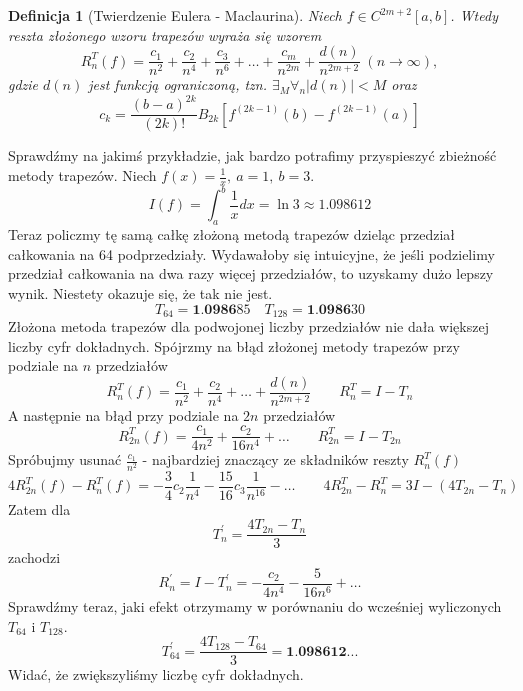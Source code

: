 \documentclass{article}
\newtheorem{defi}{Definicja}
\begin{document}
\begin{defi}[Twierdzenie Eulera - Maclaurina]
	Niech $f \in C^{2m + 2}[a,b]$. Wtedy reszta złożonego wzoru trapezów wyraża się wzorem
	\begin{equation}
		R_n^T(f) = \frac{c_1}{n^2} + \frac{c_2}{n^4} + \frac{c_3}{n^6} + \ldots + \frac{c_m}{n^{2m}} + \frac{d(n)}{n^{2m + 2}} \; (n \to \infty),
	\end{equation}
	gdzie $d(n)$ jest funkcją ograniczoną, tzn. $\exists_{M} \forall_{n} |d(n)| < M$ oraz
	\begin{equation*}
		c_k = \frac{(b - a)^{2k}}{(2k)!} B_{2k} [f^{(2k - 1)}(b) - f^{(2k - 1)}(a)]
	\end{equation*}
\end{defi}

Sprawdźmy na jakimś przykładzie, jak bardzo potrafimy przyspieszyć zbieżność metody trapezów. Niech $f(x) = \frac{1}{x},\ a = 1,\ b = 3$.
\begin{equation*}
	I(f) = \int_a^b \frac{1}{x} dx = \ln 3 \approx 1.098612
\end{equation*}
Teraz policzmy tę samą całkę złożoną metodą trapezów dzieląc przedział całkowania na 64 podprzedziały.
Wydawałoby się intuicyjne, że jeśli podzielimy przedział całkowania na dwa razy więcej przedziałów,
to uzyskamy dużo lepszy wynik. Niestety okazuje się, że tak nie jest.
\begin{equation*}
	T_{64} = \textbf{1.0986}85 \quad T_{128} = \textbf{1.0986}30
\end{equation*}
Złożona metoda trapezów dla podwojonej liczby przedziałów nie dała większej liczby cyfr dokładnych.
Spójrzmy na błąd złożonej metody trapezów przy podziale na $n$ przedziałów
\begin{equation*}
	R_n^T(f) = \frac{c_1}{n^2} + \frac{c_2}{n^4} + \ldots + \frac{d(n)}{n^{2m + 2}} \quad\quad R_n^T = I - T_n
\end{equation*}
A następnie na błąd przy podziale na $2n$ przedziałów
\begin{equation*}
	R_{2n}^T(f) = \frac{c_1}{4n^2} + \frac{c_2}{16n^4} + \ldots  \quad\quad R_{2n}^T = I - T_{2n}
\end{equation*}
Spróbujmy usunać $\frac{c_1}{n^2}$ - najbardziej znaczący ze składników reszty $R_n^T(f)$
\begin{equation*}
	4R_{2n}^T(f) - R_n^T(f) = -\frac{3}{4} c_2 \frac{1}{n^4} - \frac{15}{16} c_3 \frac{1}{n^{16}} - \ldots \quad\quad 4R_{2n}^T - R_n^T = 3I - (4T_{2n} - T_n)
\end{equation*}
Zatem dla
\begin{equation*}
	T_n^\prime = \frac{4T_{2n} - T_n}{3}
\end{equation*}
zachodzi
\begin{equation*}
	R_n^\prime = I - T_n^\prime = - \frac{c_2}{4n^4} - \frac{5}{16n^6} + \ldots
\end{equation*}
Sprawdźmy teraz, jaki efekt otrzymamy w porównaniu do wcześniej wyliczonych $T_{64}$ i $T_{128}$.
\begin{equation*}
	T_{64}^\prime = \frac{4T_{128} - T_{64}}{3} = \textbf{1.098612}...
\end{equation*}
Widać, że zwiększyliśmy liczbę cyfr dokładnych.
\end{document}
